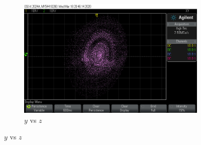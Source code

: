 \documentclass[10pt]{beamer}
\begin{document}
\begin{frame}
\begin{figure}[!ht]
\begin{subfigure}[b]{0.3\textwidth}
	    \includegraphics[trim={6cm 2cm 9cm 2cm},clip,width=\textwidth]{../imagenes/Y6p_Y_vs_Z.png}
	    \caption{$y$ vs $z$}
	    \label{Y6p_Y_vs_Z}
	  \end{subfigure}
	\end{figure}
	\end{frame}	
\end{document}
